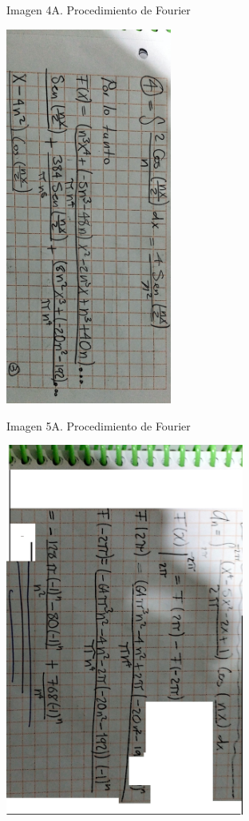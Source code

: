 Imagen 4A. Procedimiento de Fourier

\includegraphics[width=2.15104in,height=4.88023in]{media/image22.png}

Imagen 5A. Procedimiento de Fourier

\includegraphics[width=3.07924in,height=4.81771in]{media/image51.png}

